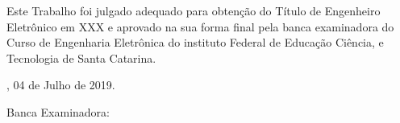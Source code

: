 \documentclass{ifscTCC} %
\begin{document}
%

\begin{folhadeaprovacao}
    \begin{center}
        \begin{center}
            \ABNTEXchapterfont\SingleSpacing\bfseries\Large\MakeUppercase\imprimirtitulo
        \end{center}
            
        \vspace*{2.0cm}
            
        \ABNTEXchapterfont\normalsize\bfseries\MakeUppercase\imprimirautor
            
        \vspace*{2.0cm}
    \end{center}
    
    
    \noindent Este Trabalho foi julgado adequado para obtenção do Título de Engenheiro Eletrônico em XXX e aprovado na sua forma final pela banca examinadora do Curso de Engenharia Eletrônica do instituto Federal de Educação Ciência, e Tecnologia de Santa Catarina.
        
    \vspace*{1.0cm}
    \begin{center}    
        \imprimirlocal, 04 de Julho de 2019.
    \end{center}
    
    \noindent Banca Examinadora:
    

\end{folhadeaprovacao}
\cleardoublepage
\end{document}
